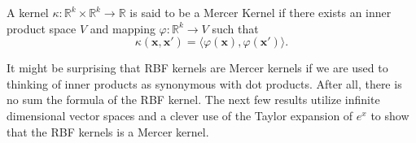 \begin{definition}
    A kernel $\kappa: \mathbb{R}^{k} \times \mathbb{R}^{k} \to \mathbb{R}$
    is said to be a Mercer Kernel if there exists an inner product space
    $V$ and mapping $\varphi: \mathbb{R}^{k} \to V$ such that
    \begin{equation*}
        \kappa(\mathbf{x}, \mathbf{x}') = \langle \varphi(\mathbf{x}), \varphi(\mathbf{x}') \rangle.
    \end{equation*}
\end{definition}

It might be surprising that RBF kernels are Mercer kernels if we are used to thinking of inner products as synonymous with dot products.
After all, there is no sum the formula of the RBF kernel.
The next few results utilize infinite dimensional vector spaces and a clever use of the Taylor expansion of $e^{x}$ to show that the RBF kernels is a Mercer kernel.

